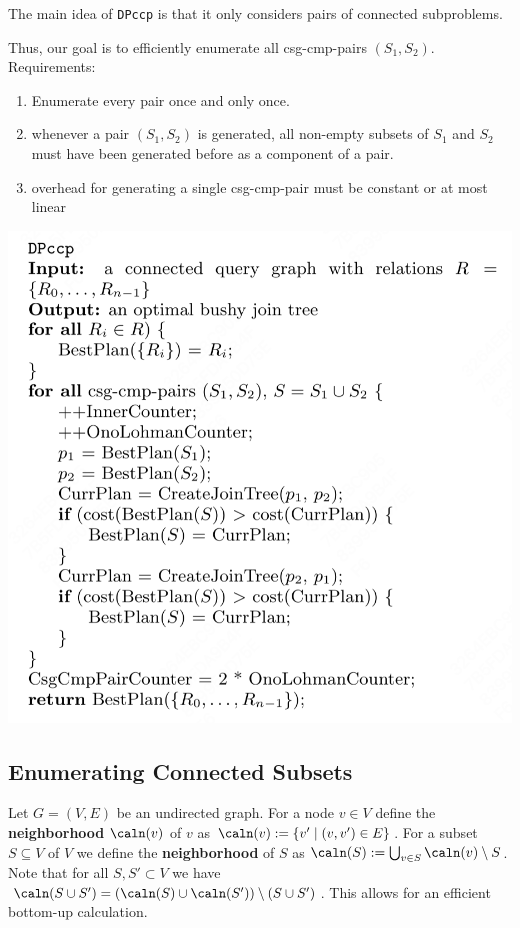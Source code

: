 \documentclass[11pt]{article}
\begin{document}
The main idea of \texttt{DPccp} is that it only considers pairs of connected subproblems.

Thus, our goal is to efficiently enumerate all csg-cmp-pairs \((S_1,S_2)\). Requirements:
\begin{enumerate}
\item Enumerate every pair once and only once.
\item whenever a pair \((S_1,S_2)\) is generated, all non-empty subsets of \(S_1\) and \(S_2\) must have
been generated before as a component of a pair.
\item overhead for generating a single csg-cmp-pair must be constant or at most linear
\end{enumerate}

\begin{center}
\includegraphics[width=.8\textwidth]{../../images/papers/100.png}
\end{center}
\subsection{Enumerating Connected Subsets}
\label{sec:orgcb4c3da}
Let \(G=(V,E)\) be an undirected graph. For a node \(v\in V\) define the \textbf{neighborhood} \(\caln(v)\) of
\(v\) as \(\caln(v):=\{v'\mid (v,v')\in E\}\). For a subset \(S\subseteq V\) of \(V\) we define the
\textbf{neighborhood} of \(S\) as \(\caln(S):=\bigcup_{v\in S}\caln(v)\setminus S\). Note that for all
\(S,S'\subset V\) we have \(\caln(S\cup S')=(\caln(S)\cup\caln(S'))\setminus(S\cup S')\). This allows
for an efficient bottom-up calculation.
\end{document}

